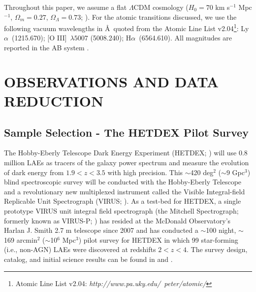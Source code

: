 \documentclass{emulateapj}
\newcommand{\lya}{Ly$\alpha$}
\newcommand{\ha}{H$\alpha$}
\newcommand{\oiii}{[O III]}
\def\z{z}
\begin{document}
Throughout this paper, we assume a flat $\Lambda$CDM cosmology ($H_{0} = 70$ km s$^{-1}$ Mpc$^{-1}$, $\Omega_{m} = 0.27$, $\Omega_{\Lambda} = 0.73$; \citealp{komatsu2011}). For the atomic transitions discussed, we use the following vacuum wavelengths in \AA\ quoted from the Atomic Line List v2.04\footnote[7]{Atomic Line List v2.04: \textit{http://www.pa.uky.edu/~peter/atomic/}}: \lya\ (1215.670); \oiii\ $\lambda5007$ (5008.240); \ha\ (6564.610). All magnitudes are reported in the AB system \citep{oke1983}.

\section{OBSERVATIONS AND DATA REDUCTION}\label{sec:Data}

\subsection{Sample Selection - The HETDEX Pilot Survey}\label{subsec:Sample}
The Hobby-Eberly Telescope Dark Energy Experiment (HETDEX; \citealp{hill2008a}) will use 0.8 million LAEs as tracers of the galaxy power spectrum and measure the evolution of dark energy from $1.9 < \z < 3.5$ with high precision. This $\sim$420 deg$^2$ ($\sim$9 Gpc$^3$) blind spectroscopic survey will be conducted with the Hobby-Eberly Telescope and a revolutionary new multiplexed instrument called the Visible Integral-field Replicable Unit Spectrograph (VIRUS; \citealp{hill2012}). As a test-bed for HETDEX, a single prototype VIRUS unit integral field spectrograph (the Mitchell Spectrograph; formerly known as VIRUS-P; \citealp{hill2008b}) has resided at the McDonald Observatory's Harlan J. Smith 2.7 m telescope since 2007 and has conducted a $\sim$100 night, $\sim$169 arcmin$^2$ ($\sim$10$^6$ Mpc$^3$) pilot survey for HETDEX in which 99 star-forming (i.e., non-AGN) LAEs were discovered at redshifts $2<\z<4$. The survey design, catalog, and initial science results can be found in \citet{adams2011} and \cite{blanc2011}.
\end{document}
